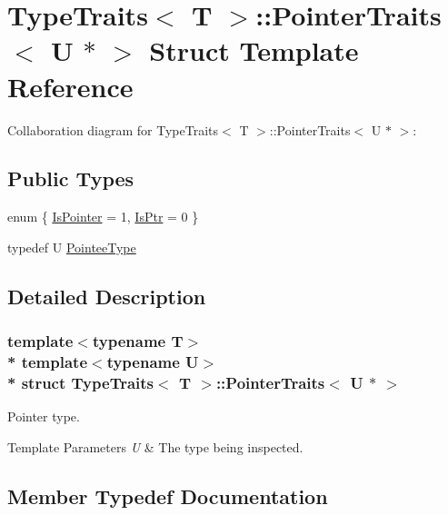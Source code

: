 \hypertarget{structTypeTraits_1_1PointerTraits_3_01U_01_5_01_4}{}\section{Type\+Traits$<$ T $>$\+:\+:Pointer\+Traits$<$ U $\ast$ $>$ Struct Template Reference}
\label{structTypeTraits_1_1PointerTraits_3_01U_01_5_01_4}


Collaboration diagram for Type\+Traits$<$ T $>$\+:\+:Pointer\+Traits$<$ U $\ast$ $>$\+:
\subsection*{Public Types}
\begin{DoxyCompactItemize}
\item 
enum \{ \hyperlink{structTypeTraits_1_1PointerTraits_3_01U_01_5_01_4_aa7cd8f8cbce42367285255b763869563a65cc154c13b6fc6cd5b7ada21a1fc079}{Is\+Pointer} = 1, 
\hyperlink{structTypeTraits_1_1PointerTraits_3_01U_01_5_01_4_aa7cd8f8cbce42367285255b763869563a54e37622c3c2ec85a6fc8de99589e749}{Is\+Ptr} = 0
 \}
\item 
typedef U \hyperlink{structTypeTraits_1_1PointerTraits_3_01U_01_5_01_4_ab1fb47a171ebefcd1275e91baa3b7b73}{Pointee\+Type}
\end{DoxyCompactItemize}


\subsection{Detailed Description}
\subsubsection*{template$<$typename T$>$\\*
template$<$typename U$>$\\*
struct Type\+Traits$<$ T $>$\+::\+Pointer\+Traits$<$ U $\ast$ $>$}

Pointer type. 
\begin{DoxyTemplParams}{Template Parameters}
{\em U} & The type being inspected. \\
\hline
\end{DoxyTemplParams}


\subsection{Member Typedef Documentation}
